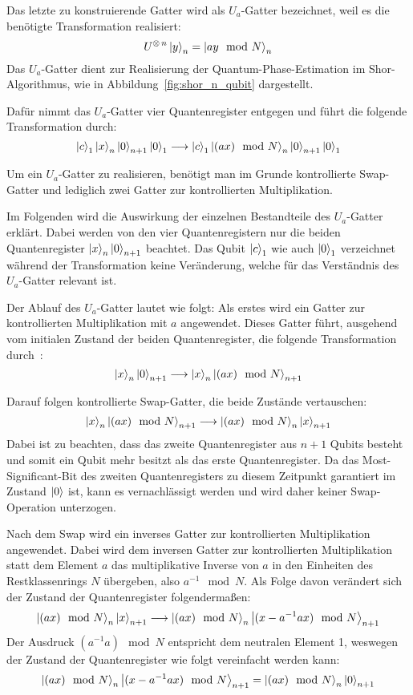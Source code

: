Das letzte zu konstruierende Gatter wird als \(U_a\)-Gatter bezeichnet, 
weil es die benötigte Transformation realisiert: 
\[U^{\operatorname{\otimes} n}\ket{y}_n = \ket{ay \mod N}_n\] 
Das \(U_a\)-Gatter dient zur Realisierung der Quantum-Phase-Estimation im Shor-Algorithmus, 
wie in Abbildung~\ref{fig:shor_n_qubit} dargestellt.

Dafür nimmt das \(U_a\)-Gatter vier Quantenregister entgegen und 
führt die folgende Transformation durch: 
\[\ket{c}_1\ket{x}_{n}\ket{0}_{n+1}\ket{0}_1
\longrightarrow
\ket{c}_1\ket{(a x) \mod N}_{n}\ket{0}_{n+1}\ket{0}_1
\]

Um ein \(U_a\)-Gatter zu realisieren, benötigt man im Grunde kontrollierte Swap-Gatter und 
lediglich zwei Gatter zur kontrollierten Multiplikation. 
 
Im Folgenden wird die Auswirkung der einzelnen Bestandteile des \(U_a\)-Gatter erklärt.
Dabei werden von den vier Quantenregistern nur die beiden 
Quantenregister \(\ket{x}_{n}\ket{0}_{n+1}\) beachtet.
Das Qubit \(\ket{c}_1\) wie auch \(\ket{0}_1\) verzeichnet während der Transformation keine Veränderung, 
welche für das Verständnis des \(U_a\)-Gatter relevant ist.

Der Ablauf des \(U_a\)-Gatter lautet wie folgt:
Als erstes wird ein Gatter zur kontrollierten Multiplikation mit \(a\) angewendet. 
Dieses Gatter führt, 
ausgehend vom initialen Zustand der beiden Quantenregister, 
die folgende Transformation durch~\cite{beauregard2003circuit}:
\[
  \ket{x}_{n}\ket{0}_{n+1}
  \longrightarrow
  \ket{x}_{n}\ket{(ax)\mod N}_{n+1}
  \]

Darauf folgen kontrollierte Swap-Gatter, die beide Zustände vertauschen:
\[
  \ket{x}_{n}\ket{(ax)\mod N}_{n+1}
\longrightarrow
\ket{(ax)\mod N}_{n}\ket{x}_{n+1}
\]
Dabei ist zu beachten, 
dass das zweite Quantenregister aus \(n+1\) Qubits besteht und
somit ein Qubit mehr besitzt als das erste Quantenregister.
Da das Most-Significant-Bit des zweiten Quantenregisters zu diesem Zeitpunkt garantiert im Zustand \(\ket{0}\) ist, 
kann es vernachlässigt werden und wird daher keiner Swap-Operation unterzogen.

Nach dem Swap wird ein inverses Gatter zur kontrollierten Multiplikation angewendet.
Dabei wird dem inversen Gatter zur kontrollierten Multiplikation statt dem Element \(a\) 
das multiplikative Inverse von \(a\) in den Einheiten des Restklassenrings \(N\) übergeben, 
also \(a^{-1} \mod N\).
Als Folge davon verändert sich der Zustand der Quantenregister folgendermaßen:  
\[\ket{(ax)\mod N}_{n}\ket{x}_{n+1}
\longrightarrow
\ket{(ax)\mod N}_{n}\ket{(x-a^{-1}ax)\mod N}_{n+1}
\] 
Der Ausdruck \((a^{-1}a)\mod N\) entspricht dem neutralen Element 1, 
weswegen der Zustand der Quantenregister wie folgt vereinfacht werden kann:  
\[
\ket{(ax)\mod N}_{n}\ket{(x-a^{-1}ax)\mod N}_{n+1}
=
\ket{(ax)\mod N}_{n}\ket{0}_{n+1}
\] 


